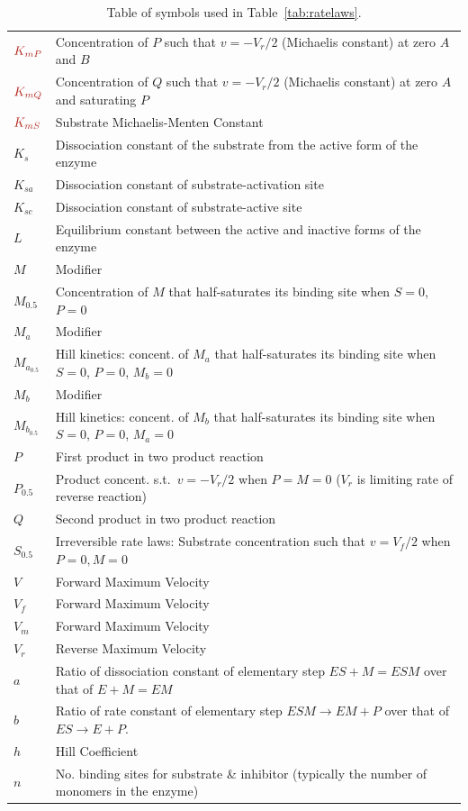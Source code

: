 \documentclass[10pt]{cekarticle}
\newcommand{\changed}[1]{\textcolor{BrickRed}{#1}}
\begin{document}
\begin{table}[ht]
\begin{tabular}{lp{5.5in}}
    $\changed{K_{mP}}$	& Concentration of $P$ such that $v = -V_r/2$  (Michaelis constant) at zero $A$ and $B$ \\
    $\changed{K_{mQ}}$	& Concentration of $Q$ such that $v = -V_r/2$  (Michaelis constant) at zero $A$ and saturating $P$ \\
    $\changed{K_{mS}}$	& Substrate Michaelis-Menten Constant \\
    $K_s$	& Dissociation constant of the substrate from the active form of the enzyme \\
    $K_{sa}$	& Dissociation constant of substrate-activation site \\
    $K_{sc}$	& Dissociation constant of substrate-active site \\
    $L$		& Equilibrium constant between the active and inactive forms of the enzyme \\
    $M$		& Modifier \\
    $M_{0.5}$	& Concentration of $M$ that half-saturates its binding site when $S = 0$, $P=0$ \\
    \changed{$M_a$}	& Modifier \\
    \changed{$M_{a_{0.5}}$} & Hill kinetics: concent. of $M_a$ that half-saturates its binding site when $S = 0$, $P=0$, $M_b=0$\\
    \changed{$M_b$}	& Modifier \\
    \changed{$M_{b_{0.5}}$} & Hill kinetics: concent. of $M_b$ that half-saturates its binding site when $S = 0$, $P=0$, $M_a=0$\\
    $P$		& First product in two product reaction \\
    \changed{$P_{0.5}$}	& Product concent. s.t.\ $v = - V_r/2$ when $P = M = 0$ ($V_r$ is limiting rate of reverse reaction) \\
    $Q$		& Second product in two product reaction \\
    \changed{$S_{0.5}$}	& Irreversible rate laws: Substrate concentration such that $v = V_f/2$ when $P = 0, M=0$ \\
    $V$		& Forward Maximum Velocity \\
    $V_f$	& Forward Maximum Velocity \\
    $V_m$	& Forward Maximum Velocity \\
    $V_r$	& Reverse Maximum Velocity \\
    $a$		& Ratio of dissociation constant of elementary step $ES + M = ESM$ over that of $E + M = EM$ \\
    $b$		& Ratio of rate constant of elementary step $ESM \to EM + P$ over that of $ES \to E + P$. \\
    $h$		& Hill Coefficient \\
    $n$		& No. binding sites for substrate \& inhibitor (typically the number of monomers in the enzyme) \\
    \bottomrule
  \end{tabular}
  \caption{Table of symbols used in Table~\ref{tab:ratelaws}.}
\end{table}
\end{document}
